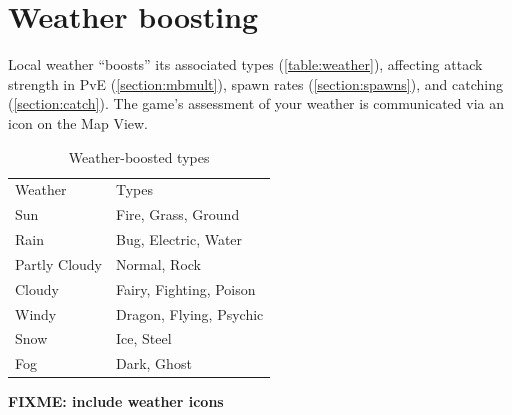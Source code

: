 \section{Weather boosting}
\label{section:weather}
Local weather ``boosts'' its associated types (\autoref{table:weather}), affecting attack strength
 in PvE (\autoref{section:mbmult}),
 spawn rates (\autoref{section:spawns}), and catching (\autoref{section:catch}).
The game's assessment of your weather is communicated via an icon on the Map View.
\begin{table}[ht]
\begin{center}
  \begin{tabular}{ll}
    Weather & Types \\
    \Midrule
    Sun & Fire, Grass, Ground \\
    Rain & Bug, Electric, Water \\
    Partly Cloudy & Normal, Rock \\
    Cloudy & Fairy, Fighting, Poison \\
    Windy & Dragon, Flying, Psychic \\
    Snow & Ice, Steel \\
    Fog & Dark, Ghost \\
  \end{tabular}
  \caption{Weather-boosted types}
  \label{table:weather}
\end{center}
\end{table}
\textbf{FIXME: include weather icons}
